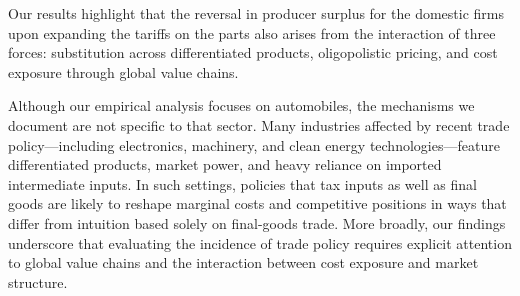 \documentclass[11pt]{article}
\begin{document}


Our results highlight that the reversal in producer surplus for the domestic firms upon expanding the tariffs on the parts also arises from the interaction of three forces: substitution across differentiated products, oligopolistic pricing, and cost exposure through global value chains.




Although our empirical analysis focuses on automobiles, the mechanisms we document are not specific to that sector. Many industries affected by recent trade policy—including electronics, machinery, and clean energy technologies—feature differentiated products, market power, and heavy reliance on imported intermediate inputs. In such settings, policies that tax inputs as well as final goods are likely to reshape marginal costs and competitive positions in ways that differ from intuition based solely on final-goods trade. More broadly, our findings underscore that evaluating the incidence of trade policy requires explicit attention to global value chains and the interaction between cost exposure and market structure.
\end{document}
